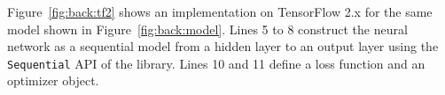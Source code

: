 Figure~\ref{fig:back:tf2} shows an implementation on TensorFlow 2.x for the
same model shown in Figure~\ref{fig:back:model}.
Lines 5 to 8 construct the neural network as a sequential model from a
hidden layer to an output layer using the {\tt Sequential} API of the
library.
Lines 10 and 11 define a loss function and an optimizer object.  
